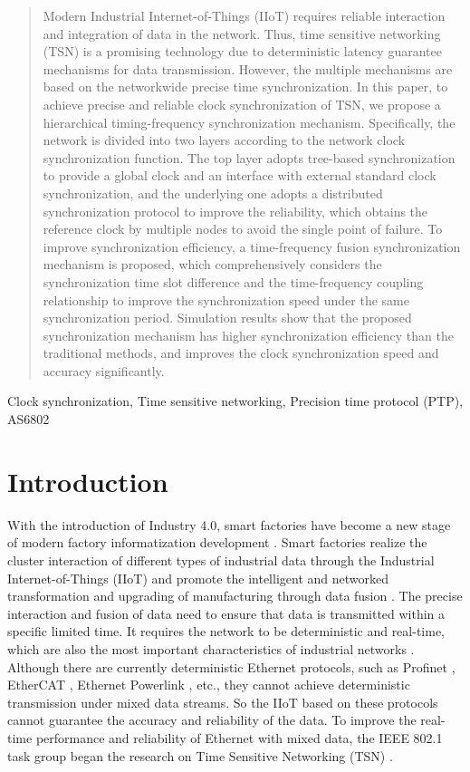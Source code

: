 \documentclass[conference]{IEEEtran}
\begin{document}
\begin{abstract}
Modern Industrial Internet-of-Things (IIoT) requires reliable interaction and integration of data in the network. Thus, time sensitive networking (TSN) is a promising technology due to deterministic latency guarantee mechanisms for data transmission. However, the multiple mechanisms are based on the networkwide precise time synchronization. In this paper, to achieve precise and reliable clock synchronization of TSN, we propose a hierarchical timing-frequency synchronization mechanism. Specifically, the network is divided into two layers according to the network clock synchronization function. The top layer adopts tree-based synchronization to provide a global clock and an interface with external standard clock synchronization, and the underlying one adopts a distributed synchronization protocol to improve the reliability, which obtains the reference clock by multiple nodes to avoid the single point of failure. To improve synchronization efficiency, a time-frequency fusion synchronization mechanism is proposed, which comprehensively considers the synchronization time slot difference and the time-frequency coupling relationship to improve the synchronization speed under the same synchronization period. Simulation results show that the proposed synchronization mechanism has higher synchronization efficiency than the traditional methods, and improves the clock synchronization speed and accuracy significantly.
\end{abstract}

\begin{IEEEkeywords}
Clock synchronization, Time sensitive networking, Precision time protocol (PTP), AS6802
\end{IEEEkeywords}

\section{Introduction}
With the introduction of Industry 4.0, smart factories have become a new stage of modern factory informatization development \cite{ref15}. Smart factories realize the cluster interaction of different types of industrial data through the Industrial Internet-of-Things (IIoT) and promote the intelligent and networked transformation and upgrading of manufacturing through data fusion \cite{ref18}. The precise interaction and fusion of data need to ensure that data is transmitted within a specific limited time. It requires the network to be deterministic and real-time, which are also the most important characteristics of industrial networks \cite{ref19}. Although there are currently deterministic Ethernet protocols, such as Profinet \cite{ref29}, EtherCAT \cite{ref30}, Ethernet Powerlink \cite{ref32}, etc., they cannot achieve deterministic transmission under mixed data streams. So the IIoT based on these protocols cannot guarantee the accuracy and reliability of the data. To improve the real-time performance and reliability of Ethernet with mixed data, the IEEE 802.1 task group began the research on Time Sensitive Networking (TSN) \cite{ref21}.
\end{document}
